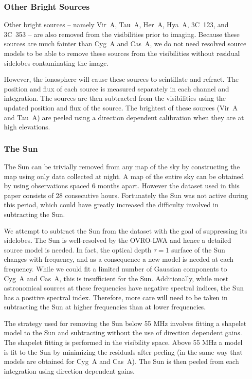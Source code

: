 \documentclass[twocolumn]{aastex61}
\begin{document}
\subsubsection{Other Bright Sources}

Other bright sources -- namely Vir~A, Tau~A, Her~A, Hya~A, 3C~123, and 3C~353 -- are also removed
from the visibilities prior to imaging. Because these sources are much fainter than Cyg~A and Cas~A,
we do not need resolved source models to be able to remove these sources from the visibilities
without residual sidelobes contaminating the image.

However, the ionosphere will cause these sources to scintillate and refract. The position and flux
of each source is measured separately in each channel and integration. The sources are then
subtracted from the visibilities using the updated position and flux of the source. The brightest of
these sources (Vir~A and Tau~A) are peeled using a direction dependent calibration when they are at
high elevations.

\subsubsection{The Sun}

The Sun can be trivially removed from any map of the sky by constructing the map using only data
collected at night. A map of the entire sky can be obtained by using observations spaced 6 months
apart.  However the dataset used in this paper consists of 28 consecutive hours. Fortunately the Sun
was not active during this period, which could have greatly increased the difficulty involved in
subtracting the Sun.

We attempt to subtract the Sun from the dataset with the goal of suppressing its sidelobes.  The Sun
is well-resolved by the OVRO-LWA and hence a detailed source model is needed. In fact, the optical
depth $\tau=1$ surface of the Sun changes with frequency, and as a consequence a new model is needed
at each frequency. While we could fit a limited number of Gaussian components to Cyg~A and Cas~A,
this is insufficient for the Sun.  Additionally, while most astronomical sources at these
frequencies have negative spectral indices, the Sun has a positive spectral index. Therefore, more
care will need to be taken in subtracting the Sun at higher frequencies than at lower frequencies.

The strategy used for removing the Sun below 55 MHz involves fitting a shapelet
\citep{2003MNRAS.338...35R} model to the Sun and subtracting without the use of direction dependent
gains. The shapelet fitting is performed in the visibility space. Above 55 MHz a model is fit to the
Sun by minimizing the residuals after peeling (in the same way that models are obtained for Cyg~A
and Cas~A). The Sun is then peeled from each integration using direction dependent gains.
\end{document}
